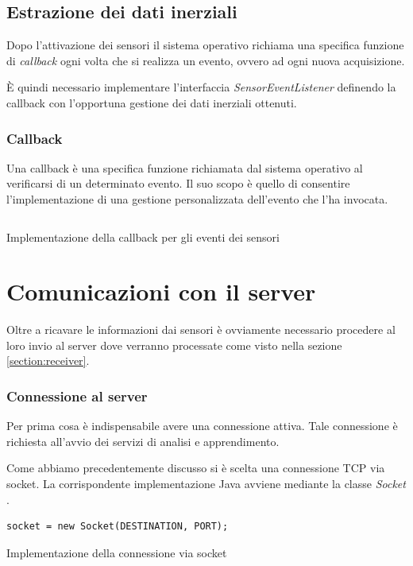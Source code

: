 \newpage
\subsection{Estrazione dei dati inerziali}
Dopo l'attivazione dei sensori il sistema operativo richiama una specifica funzione di \textit{callback} ogni volta 
che si realizza un evento, ovvero ad ogni nuova acquisizione.

È quindi necessario implementare l'interfaccia \textit{SensorEventListener} \cite{sensor_listener} definendo la 
callback con l'opportuna gestione dei dati inerziali ottenuti.

\subsubsection{Callback}
Una callback è una specifica funzione richiamata dal sistema operativo al verificarsi di un determinato evento.
Il suo scopo è quello di consentire l'implementazione di una gestione personalizzata dell'evento che l'ha invocata.
\vfill
\begin{listing}[H] 
    \inputminted[frame=single,framesep=10pt]{java}{assets/snippets/app/sensors.java}
    \caption{Implementazione della callback per gli eventi dei sensori}
    \label{listing:sensor-event-callback}
\end{listing}

\newpage
\section{Comunicazioni con il server}
Oltre a ricavare le informazioni dai sensori è ovviamente necessario procedere al loro invio al server  
dove verranno processate come visto nella sezione \ref{section:receiver}.
\subsubsection{Connessione al server}
Per prima cosa è indispensabile avere una connessione attiva. Tale connessione è richiesta all'avvio dei servizi di 
analisi e apprendimento.

Come abbiamo precedentemente discusso si è scelta una connessione TCP via socket. La corrispondente implementazione Java
avviene mediante la classe \textit{Socket} \cite{socket}.
\begin{listing}[H] 
    \begin{verbatim}
socket = new Socket(DESTINATION, PORT);
    \end{verbatim}
    \caption{Implementazione della connessione via socket}
\end{listing}

